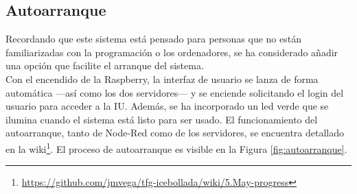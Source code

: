 \subsection{Autoarranque}
Recordando que este sistema está pensado para personas que no están familiarizadas con la programación o los ordenadores, se ha considerado añadir una opción que facilite el arranque del sistema.\\

Con el encendido de la Raspberry, la interfaz de usuario se lanza de forma automática ---así como los dos servidores--- y se enciende solicitando el login del usuario para acceder a la IU. Además, se ha incorporado un led verde que se ilumina cuando el sistema está listo para ser usado. El funcionamiento del autoarranque, tanto de Node-Red como de los servidores, se encuentra detallado en la wiki\footnote{\url{https://github.com/jmvega/tfg-icebollada/wiki/5.May-progress}}. El proceso de autoarranque es visible en la Figura \ref{fig:autoarranque}.
